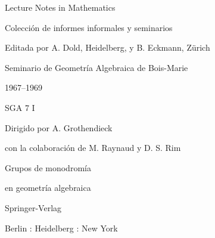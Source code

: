 

\providecommand{\SGASevenSourceGapES}[1]{\textit{[laguna visual: #1]}}
\providecommand{\SGASevenSourceObstructionES}[1]{\textit{[oculto por #1]}}

\begin{center}
Lecture Notes in Mathematics

Colección de informes informales y seminarios

Editada por A. Dold, Heidelberg, y B. Eckmann, Zürich


\bigskip
Seminario de Geometría Algebraica de Bois-Marie

1967--1969

SGA 7 I

Dirigido por A. Grothendieck

con la colaboración de M. Raynaud y D. S. Rim

\bigskip
Grupos de monodromía

en geometría algebraica

\bigskip
Springer-Verlag

Berlin : Heidelberg : New York
\end{center}
\clearpage

